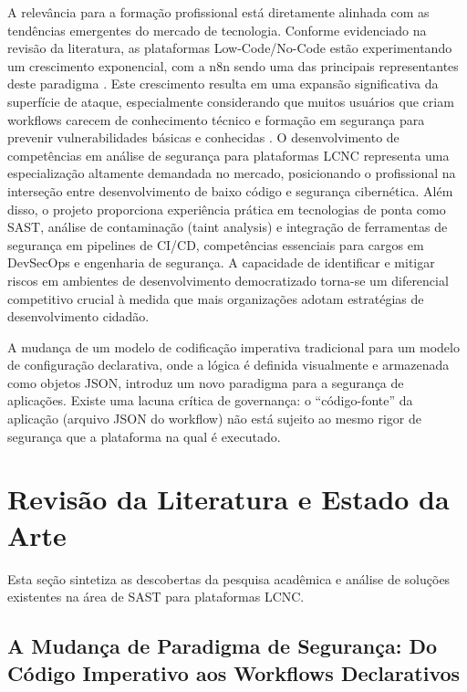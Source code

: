\documentclass{sftex}
\begin{document}
A relevância para a formação profissional está diretamente alinhada com as tendências emergentes do mercado de tecnologia. Conforme evidenciado na revisão da literatura, as plataformas Low-Code/No-Code estão experimentando um crescimento exponencial, com a n8n sendo uma das principais representantes deste paradigma \cite{n8n_platform}. Este crescimento resulta em uma expansão significativa da superfície de ataque, especialmente considerando que muitos usuários que criam workflows carecem de conhecimento técnico e formação em segurança para prevenir vulnerabilidades básicas e conhecidas \cite{n8n_cloud_security}. O desenvolvimento de competências em análise de segurança para plataformas LCNC representa uma especialização altamente demandada no mercado, posicionando o profissional na interseção entre desenvolvimento de baixo código e segurança cibernética. Além disso, o projeto proporciona experiência prática em tecnologias de ponta como SAST, análise de contaminação (taint analysis) e integração de ferramentas de segurança em pipelines de CI/CD, competências essenciais para cargos em DevSecOps e engenharia de segurança. A capacidade de identificar e mitigar riscos em ambientes de desenvolvimento democratizado torna-se um diferencial competitivo crucial à medida que mais organizações adotam estratégias de desenvolvimento cidadão.

A mudança de um modelo de codificação imperativa tradicional para um modelo de configuração declarativa, onde a lógica é definida visualmente e armazenada como objetos JSON, introduz um novo paradigma para a segurança de aplicações. Existe uma lacuna crítica de governança: o “código-fonte” da aplicação (arquivo JSON do workflow) não está sujeito ao mesmo rigor de segurança que a plataforma na qual é executado.

\newpage

\section{Revisão da Literatura e Estado da Arte}

Esta seção sintetiza as descobertas da pesquisa acadêmica e análise de soluções existentes na área de SAST para plataformas LCNC.

\subsection{A Mudança de Paradigma de Segurança: Do Código Imperativo aos Workflows Declarativos}
\end{document}
